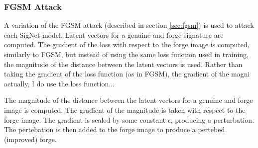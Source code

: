 



\subsubsection{FGSM Attack}\label{my_fgsm}
A variation of the FGSM attack (described in section \ref{sec:fgsm}) is used to attack each SigNet model.
Latent vectors for a genuine and forge signature are computed.
The gradient of the loss with respect to the forge image is computed, similarly to FGSM, but instead of using the same loss function used in training, the magnitude of the distance between the latent vectors is used.
Rather than taking the gradient of the loss function (as in FGSM), the gradient of the magni
    actually, I do use the loss function...

The magnitude of the distance between the latent vectors for a genuine and forge image is computed.
The gradient of the magnitude is taken with respect to the forge image.
The gradient is scaled by some constant $\epsilon$, producing a perturbation.
The pertebation is then added to the forge image to produce a pertebed (improved) forge.

